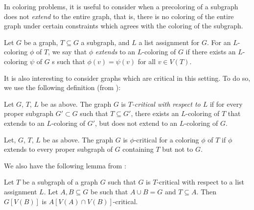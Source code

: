 
In coloring problems, it is useful to consider when a precoloring of a subgraph
does not \emph{extend} to the entire graph, that is, there is no coloring
of the entire graph under certain constraints which agrees with the coloring 
of the subgraph. 




\begin{definition}[Extending]
	Let $G$ be a graph, $T \subseteq G$ a subgraph, and $L$ a list assignment
	for $G$. For an $L$-coloring $\phi$ of $T$, we say that $\phi$ \emph{extends}
	to an $L$-coloring of $G$ if there exists an $L$-coloring $\psi$ of $G$
s	such that $\phi(v) = \psi(v)$ for all $v \in V(T)$. 
	
\end{definition}

It is also interesting to consider graphs which are critical in this setting. To do so, we use the following definition (from \cite{fivelistcoloring2}):

\begin{definition}[$T$-critical]
	Let $G$, $T$, $L$ be as above. The graph $G$ is \emph{$T$-critical with respect to $L$} if for every proper subgraph $G' \subset G$ such that $T \subseteq G'$, there exists an $L$-coloring of $T$ that extends to an $L$-coloring of $G'$, but does not extend to an $L$-coloring of $G$.
\end{definition}

\begin{definition}
	Let, $G$, $T$, $L$ be as above. The graph $G$ is $\phi$-critical for a coloring $\phi$ of $T$ if $\phi$ extends to every proper subgraph of $G$ containing $T$ but not to $G$.
\end{definition}

We also have the following lemma from \cite{fivelistcoloring2}:

\begin{lemma}
\label{pregluinglemma}
Let $T$ be a subgraph of a graph $G$ such that $G$ is $T$-critical with respect to a list assignment $L$. Let $A, B \subseteq G$ be such that $A \cup B = G$ and $T \subseteq A$. Then $G[V(B)]$ is $A[V(A) \cap V(B)]$-critical.
\end{lemma}

